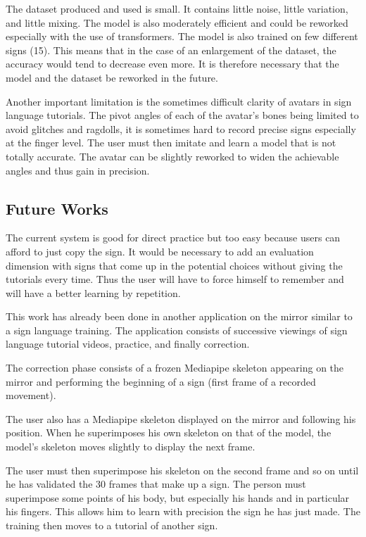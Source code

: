 The dataset produced and used is small. It contains little noise, little variation, and little mixing. The model is also moderately efficient and could be reworked especially with the use of transformers. The model is also trained on few different signs (15). This means that in the case of an enlargement of the dataset, the accuracy would tend to decrease even more. It is therefore necessary that the model and the dataset be reworked in the future.

Another important limitation is the sometimes difficult clarity of avatars in sign language tutorials. The pivot angles of each of the avatar's bones being limited to avoid glitches and ragdolls, it is sometimes hard to record precise signs especially at the finger level. The user must then imitate and learn a model that is not totally accurate. The avatar can be slightly reworked to widen the achievable angles and thus gain in precision.

\subsection{Future Works}

The current system is good for direct practice but too easy because users can afford to just copy the sign. It would be necessary to add an evaluation dimension with signs that come up in the potential choices without giving the tutorials every time. Thus the user will have to force himself to remember and will have a better learning by repetition.

This work has already been done in another application on the mirror similar to a sign language training. The application consists of successive viewings of sign language tutorial videos, practice, and finally correction. 

The correction phase consists of a frozen Mediapipe skeleton appearing on the mirror and performing the beginning of a sign (first frame of a recorded movement). 

The user also has a Mediapipe skeleton displayed on the mirror and following his position. When he superimposes his own skeleton on that of the model, the model's skeleton moves slightly to display the next frame. 

The user must then superimpose his skeleton on the second frame and so on until he has validated the 30 frames that make up a sign. The person must superimpose some points of his body, but especially his hands and in particular his fingers. This allows him to learn with precision the sign he has just made. The training then moves to a tutorial of another sign. 

